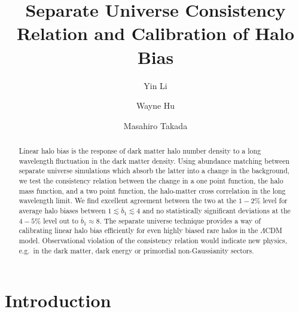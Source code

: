 \documentclass[prd,twocolumn,amsmath,amssymb,floatfix,superscriptaddress]{revtex4-1}
\begin{document}
\title{Separate Universe Consistency Relation and Calibration of Halo Bias}
\author{Yin Li}
\author{Wayne Hu}
\author{Masahiro Takada}

\begin{abstract}
Linear halo bias is the response of dark matter halo number density to a long wavelength
fluctuation in the dark matter density.  
Using abundance matching between separate universe simulations which absorb the latter into a change in the background, we test the consistency relation between the change in a one point
function, the halo mass function, and a two point function, the halo-matter cross correlation in
the long wavelength limit. We find excellent agreement between the two at the $1-2\%$ level
for average halo biases between $1 \lesssim \bar b_1 \lesssim 4$ and no statistically
significant deviations at the $4-5\%$ level out to $\bar b_1  \approx 8$.  The separate universe
technique provides a way of calibrating linear halo bias efficiently for even highly biased rare
halos in the $\Lambda$CDM model.   Observational violation of the consistency relation
would indicate new physics, e.g.~in the dark matter, dark energy or primordial non-Gaussianity
sectors. 
\end{abstract}

\maketitle




\section{Introduction}
\label{sec:intro}
\end{document}
